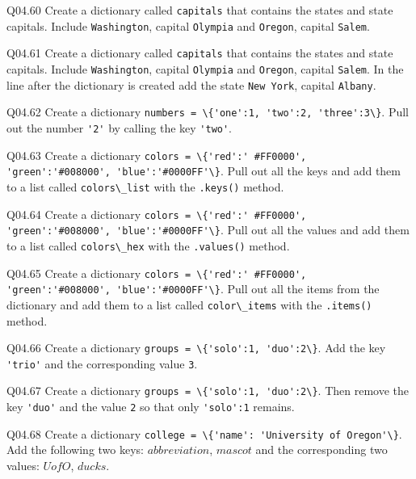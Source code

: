\documentclass{book}
\newcommand{\passthrough}[1]{#1}
\begin{document}
Q04.60 Create a dictionary called \passthrough{\lstinline!capitals!}
that contains the states and state capitals. Include
\passthrough{\lstinline!Washington!}, capital
\passthrough{\lstinline!Olympia!} and \passthrough{\lstinline!Oregon!},
capital \passthrough{\lstinline!Salem!}.

Q04.61 Create a dictionary called \passthrough{\lstinline!capitals!}
that contains the states and state capitals. Include
\passthrough{\lstinline!Washington!}, capital
\passthrough{\lstinline!Olympia!} and \passthrough{\lstinline!Oregon!},
capital \passthrough{\lstinline!Salem!}. In the line after the
dictionary is created add the state \passthrough{\lstinline!New York!},
capital \passthrough{\lstinline!Albany!}.

Q04.62 Create a dictionary
\passthrough{\lstinline!numbers = \{'one':1, 'two':2, 'three':3\}!}.
Pull out the number \passthrough{\lstinline!'2'!} by calling the key
\passthrough{\lstinline!'two'!}.

Q04.63 Create a dictionary
\passthrough{\lstinline!colors = \{'red':' #FF0000', 'green':'#008000', 'blue':'#0000FF'\}!}.
Pull out all the keys and add them to a list called
\passthrough{\lstinline!colors\_list!} with the
\passthrough{\lstinline!.keys()!} method.

Q04.64 Create a dictionary
\passthrough{\lstinline!colors = \{'red':' #FF0000', 'green':'#008000', 'blue':'#0000FF'\}!}.
Pull out all the values and add them to a list called
\passthrough{\lstinline!colors\_hex!} with the
\passthrough{\lstinline!.values()!} method.

Q04.65 Create a dictionary
\passthrough{\lstinline!colors = \{'red':' #FF0000', 'green':'#008000', 'blue':'#0000FF'\}!}.
Pull out all the items from the dictionary and add them to a list called
\passthrough{\lstinline!color\_items!} with the
\passthrough{\lstinline!.items()!} method.

Q04.66 Create a dictionary
\passthrough{\lstinline!groups = \{'solo':1, 'duo':2\}!}. Add the key
\passthrough{\lstinline!'trio'!} and the corresponding value
\passthrough{\lstinline!3!}.

Q04.67 Create a dictionary
\passthrough{\lstinline!groups = \{'solo':1, 'duo':2\}!}. Then remove
the key \passthrough{\lstinline!'duo'!} and the value
\passthrough{\lstinline!2!} so that only
\passthrough{\lstinline!'solo':1!} remains.

Q04.68 Create a dictionary
\passthrough{\lstinline!college = \{'name': 'University of Oregon'\}!}.
Add the following two keys: \(abbreviation\), \(mascot\) and the
corresponding two values: \(UofO\), \(ducks\).
    
\end{document}
